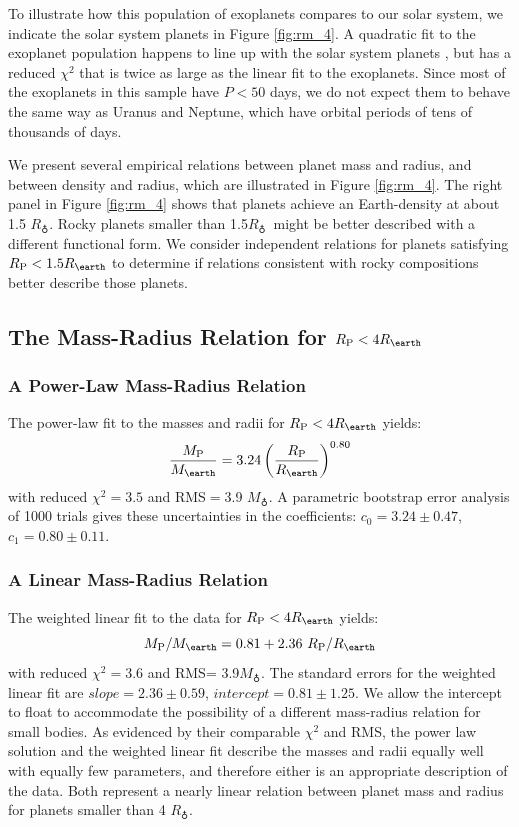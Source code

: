 \documentclass[iop]{emulateapj}
\newcommand{\rpl}{\ensuremath{R_{\rm P}}}
\newcommand{\mpl}{\ensuremath{M_{\rm P}}}
\newcommand{\rearth}{\ensuremath{R_\earth}}
\newcommand{\mearth}{\ensuremath{M_\earth}}
\newcommand{\rspecial}{4 \rearth}
\begin{document}
To illustrate how this population of exoplanets compares to our solar system, we indicate the solar system planets in Figure \ref{fig:rm_4}.  A quadratic fit to the exoplanet population happens to line up with the solar system planets \citep{Lissauer2011}, but has a reduced $\chi^2$ that is twice as large as the linear fit to the exoplanets.  Since most of the exoplanets in this sample have $P < 50$ days, we do not expect them to behave the same way as Uranus and Neptune, which have orbital periods of tens of thousands of days.

We present several empirical relations between planet mass and radius, and between density and radius, which are illustrated in Figure \ref{fig:rm_4}.  The right panel in Figure \ref{fig:rm_4} shows that planets achieve an Earth-density at about 1.5 \rearth.  Rocky planets smaller than 1.5\rearth\ might be better described with a different functional form.  We consider independent relations for planets satisfying $\rpl < 1.5 \rearth$ to determine if relations consistent with rocky compositions better describe those planets.

\subsection{The Mass-Radius Relation for $\rpl < \rspecial$}
\subsubsection{A Power-Law Mass-Radius Relation}
The power-law fit to the masses and radii for $\rpl < \rspecial$ yields:
\begin{equation}
\frac{\mpl}{\mearth} = 3.24 \left(\frac{\rpl}{\rearth}\right)^{0.80}
\label{eqn:mr_plaw}
\end{equation}
with reduced $\chi^2=3.5$ and RMS$=$3.9 \mearth.  A parametric bootstrap error analysis of 1000 trials gives these uncertainties in the coefficients: $c_0 = 3.24 \pm 0.47$, $c_1 = 0.80\pm 0.11$.

\subsubsection{A Linear Mass-Radius Relation}
The weighted linear fit to the data for $\rpl < \rspecial$ yields:
\begin{equation}
\mpl/\mearth = 0.81 + 2.36~\rpl/\rearth
\label{eqn:mr_linear}
\end{equation}
with reduced $\chi^2=3.6$ and RMS= 3.9\mearth.  The standard errors for the weighted linear fit are $slope = 2.36 \pm 0.59$, $intercept= 0.81\pm1.25$.  We allow the intercept to float to accommodate the possibility of a different mass-radius relation for small bodies.  As evidenced by their comparable $\chi^2$ and RMS, the power law solution and the weighted linear fit describe the masses and radii equally well with equally few parameters, and therefore either is an appropriate description of the data. Both represent a nearly linear relation between planet mass and radius for planets smaller than 4 \rearth.
\end{document}
